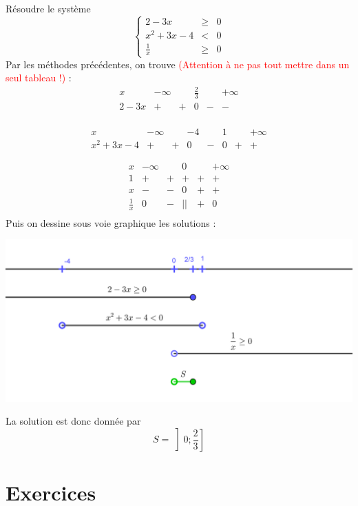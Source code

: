 \begin{exemple}
Résoudre le système 
$$
\left\{
\begin{array}{rcl}
2-3x &\geq& 0\\
x^2 + 3x -4 &<& 0\\
\frac{1}{x} &\geq & 0
\end{array}
\right.
$$
Par les méthodes précédentes, on trouve \textcolor{red}{(Attention à ne pas tout mettre dans un seul tableau !)} :
$$
\begin{array}{l|l|l|l|l|l}
x & -\infty & & \frac{2}{3} &  & +\infty\\
\hline
2-3x & + & + & 0 & - & - \\
\end{array}
$$

$$
\begin{array}{l|l|l|l|l|l|l|l}
x & -\infty &  & -4 & & 1 & & +\infty\\
\hline
x^2 + 3x -4 & + & + & 0 & - & 0 & + & +\
\end{array}
$$

$$
\begin{array}{l|l|l|l|l|l}
x & -\infty & & 0 & & +\infty \\
\hline
1 & + & + & + & + & + \\
\hline
x & - & - & 0 & + & + \\
\hline
\hline
\frac{1}{x} & 0 & - & || & + & 0\\
\end{array}
$$
Puis on dessine sous voie graphique les solutions :
\begin{center}
\includegraphics[width = 0.9 \textwidth]{inequation2/systeme.png}
\end{center}
La solution est donc donnée par
$$
S=\left]0;\frac{2}{3}\right]
$$
\end{exemple}

\section{Exercices}

